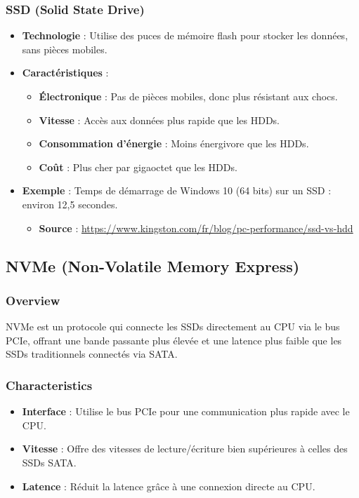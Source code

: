 \documentclass[10pt,a4paper]{article}
\begin{document}
\subsubsection*{SSD (Solid State Drive)}
\begin{itemize}
    \item \textbf{Technologie} : Utilise des puces de mémoire flash pour stocker les données, sans pièces mobiles.
    \item \textbf{Caractéristiques} :
    \begin{itemize}
        \item \textbf{Électronique} : Pas de pièces mobiles, donc plus résistant aux chocs.
        \item \textbf{Vitesse} : Accès aux données plus rapide que les HDDs.
        \item \textbf{Consommation d'énergie} : Moins énergivore que les HDDs.
        \item \textbf{Coût} : Plus cher par gigaoctet que les HDDs.
    \end{itemize}
    \item \textbf{Exemple} : Temps de démarrage de Windows 10 (64 bits) sur un SSD : environ 12,5 secondes.
    \begin{itemize}
        \item \textbf{Source} : \url{https://www.kingston.com/fr/blog/pc-performance/ssd-vs-hdd}
    \end{itemize}
\end{itemize}

\subsection*{NVMe (Non-Volatile Memory Express)}

\subsubsection*{Overview}
NVMe est un protocole qui connecte les SSDs directement au CPU via le bus PCIe, offrant une bande passante plus élevée et une latence plus faible que les SSDs traditionnels connectés via SATA.

\subsubsection*{Characteristics}
\begin{itemize}
    \item \textbf{Interface} : Utilise le bus PCIe pour une communication plus rapide avec le CPU.
    \item \textbf{Vitesse} : Offre des vitesses de lecture/écriture bien supérieures à celles des SSDs SATA.
    \item \textbf{Latence} : Réduit la latence grâce à une connexion directe au CPU.
\end{itemize}
\end{document}
